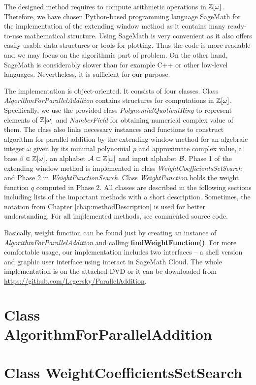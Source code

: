 The designed method requires to compute arithmetic operations in $\mathbb{Z}[\omega]$. Therefore, we have chosen Python-based programming language SageMath for the implementation of the extending window method as it contains many ready-to-use mathematical structure.  Using SageMath is very convenient as it also offers easily usable data structures or tools for plotting. Thus the code is more readable and we may focus on the algorithmic part of problem. On the other hand, SageMath is considerably slower than for example C++ or other low-level languages. Nevertheless, it is sufficient for our purpose.

The implementation is object-oriented. It consists of four classes. Class \emph{AlgorithmForParallelAddition} contains structures for computations in $\mathbb{Z}[\omega]$. Specifically, we use the provided class \emph{PolynomialQuotientRing} to represent elements of $\mathbb{Z}[\omega]$ and  \emph{NumberField} for obtaining numerical complex value of them. The class also links necessary instances and functions to construct algorithm for parallel addition by the extending window method for an algebraic integer $\omega$ given by its minimal polynomial $p$ and approximate complex value, a base $\beta\in\mathbb{Z}[\omega]$, an alphabet $\mathcal{A}\subset\mathbb{Z}[\omega]$ and input alphabet $\mathcal{B}$. Phase 1 of the extending window method is implemented in class \emph{WeightCoefficientsSetSearch} and Phase 2 in \emph{WeightFunctionSearch}. Class \emph{WeightFunction} holds the weight function $q$ computed in Phase 2. All classes are described in the following sections including lists of the important methods  with a short description. Sometimes, the notation from Chapter \ref{chap:methodDescription} is used for better understanding. For all implemented methods, see commented source code.  

Basically, weight function can be found just by creating an instance of \emph{AlgorithmForParallelAddition} and calling \textbf{findWeightFunction()}. For more comfortable usage, our implementation includes two interfaces -- a shell version and graphic user interface using interact in SageMath Cloud. The whole implementation is on the attached DVD or it can be downloaded from  \url{https://github.com/Legersky/ParallelAddition}.

\section{Class AlgorithmForParallelAddition}



\section{Class WeightCoefficientsSetSearch}



